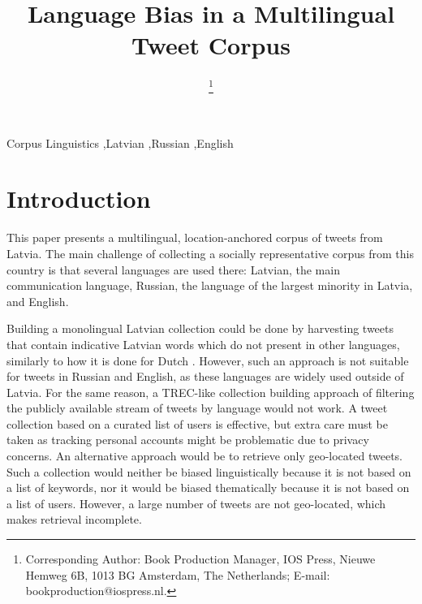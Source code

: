 \documentclass{IOS-Book-Article}
\begin{document}
\begin{frontmatter}              %

\title{Language Bias in a Multilingual Tweet Corpus}

\author[A]{ %
\thanks{Corresponding Author: Book Production Manager, IOS Press, Nieuwe Hemweg 6B,
1013 BG Amsterdam, The Netherlands; E-mail:
bookproduction@iospress.nl.}}


\address[A]{Confidential Review Copy, Do Not Distribute}

%

\begin{keyword}
Corpus Linguistics \sep Latvian \sep Russian \sep English
\end{keyword}
\end{frontmatter}

\thispagestyle{empty}
\pagestyle{empty}

\section*{Introduction}

This paper presents a multilingual, location-anchored corpus of tweets from Latvia. The main challenge of collecting a socially representative corpus from this country is that several languages are used there: Latvian, the main communication language, Russian, the language of the largest minority in Latvia, and English.

%
Building a monolingual Latvian collection could be done by harvesting tweets that contain indicative Latvian words which do not present in other languages, similarly to how it is done for Dutch \cite{sang2013}. However, such an approach is not suitable for tweets in Russian and English, as these languages are widely used outside of Latvia.
%
For the same reason, a TREC-like collection building approach \cite{lin2016overview} of filtering the publicly available stream of tweets by language would not work.
%
A tweet collection based on a curated list of users \cite{SANVICENTE16.465} is effective, but extra care must be taken as tracking personal accounts might be problematic due to privacy concerns.
%
%
An alternative approach would be to retrieve only geo-located tweets. Such a collection would neither be biased linguistically because it is not based on a list of keywords, nor it would be biased thematically because it is not based on a list of users. However, a large number of tweets are not geo-located, which makes retrieval incomplete.
\end{document}
